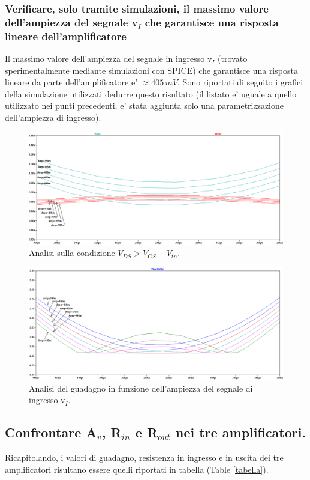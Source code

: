\documentclass[a4paper,10pt]{article}
\begin{document}
\subsubsection{Verificare, solo tramite simulazioni, il massimo valore dell'ampiezza del segnale v$_I$ che garantisce una risposta lineare dell'amplificatore}
Il massimo valore dell'ampiezza del segnale in ingresso v$_I$ (trovato sperimentalmente mediante simulazioni con SPICE) che garantisce una risposta lineare da parte dell'amplificatore e' $\approx405\,mV$. Sono riportati di seguito i grafici della simulazione utilizzati dedurre questo risultato (il listato e' uguale a quello utilizzato nei punti precedenti, e' stata aggiunta solo una parametrizzazione dell'ampiezza di ingresso).
\begin{figure}[h!]
  	\centering
 	\includegraphics[width=1\linewidth]{es2-3-4waves.png}
  	\caption{Analisi sulla condizione $V_{DS}>V_{GS}-V_{tn}$.}
  	\label{fig:es41}
\end{figure}
\begin{figure}[h!]
  	\centering
 	\includegraphics[width=1\linewidth]{es2-3-4gain.png}
  	\caption{Analisi del guadagno in funzione dell'ampiezza del segnale di ingresso v$_I$.}
  	\label{fig:es42-3}
\end{figure}

\newpage
\subsection{Confrontare A$_v$, R$_{in}$ e R$_{out}$ nei tre amplificatori.}
Ricapitolando, i valori di guadagno, resistenza in ingresso e in uscita dei tre amplificatori risultano essere quelli riportati in tabella (Table \ref{tabella}).\\
\end{document}
